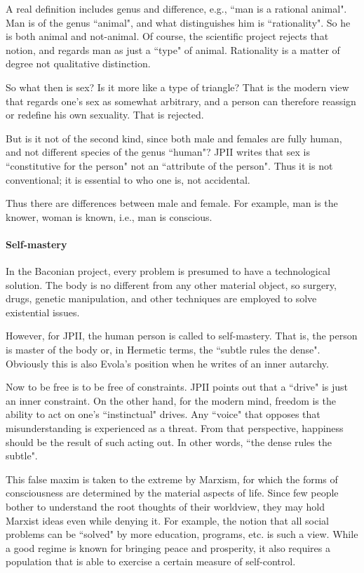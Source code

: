 A real definition includes genus and difference, e.g., ``man is a rational animal". Man is of the genus ``animal", and what distinguishes him is ``rationality". So he is both animal and not-animal. Of course, the scientific project rejects that notion, and regards man as just a ``type" of animal. Rationality is a matter of degree not qualitative distinction.

So what then is sex? Is it more like a type of triangle? That is the modern view that regards one's sex as somewhat arbitrary, and a person can therefore reassign or redefine his own sexuality. That is rejected.

But is it not of the second kind, since both male and females are fully human, and not different species of the genus ``human"? JPII writes that sex is ``constitutive for the person" not an ``attribute of the person". Thus it is not conventional; it is essential to who one is, not accidental.

Thus there are differences between male and female. For example, man is the knower, woman is known, i.e., man is conscious.

\paragraph{Self-mastery}
In the Baconian project, every problem is presumed to have a technological solution. The body is no different from any other material object, so surgery, drugs, genetic manipulation, and other techniques are employed to solve existential issues.

However, for JPII, the human person is called to self-mastery. That is, the person is master of the body or, in Hermetic terms, the ``subtle rules the dense". Obviously this is also Evola's position when he writes of an inner autarchy.

Now to be free is to be free of constraints. JPII points out that a ``drive" is just an inner constraint. On the other hand, for the modern mind, freedom is the ability to act on one's ``instinctual" drives. Any ``voice" that opposes that misunderstanding is experienced as a threat. From that perspective, happiness should be the result of such acting out. In other words, ``the dense rules the subtle".

This false maxim is taken to the extreme by Marxism, for which the forms of consciousness are determined by the material aspects of life. Since few people bother to understand the root thoughts of their worldview, they may hold Marxist ideas even while denying it. For example, the notion that all social problems can be ``solved" by more education, programs, etc. is such a view. While a good regime is known for bringing peace and prosperity, it also requires a population that is able to exercise a certain measure of self-control.

